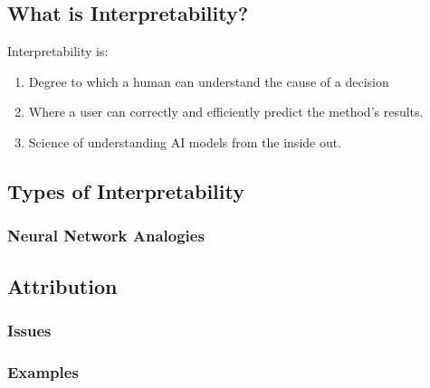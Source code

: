 \begin{motivation}

\end{motivation}

\subsection{What is Interpretability?}
\begin{definition}
    Interpretability is:
    \begin{enumerate}
        \item Degree to which a human can understand the cause of a decision
        \item Where a user can correctly and efficiently predict the method's results. 
        \item Science of understanding AI models from the inside out. 
    \end{enumerate}
\end{definition}

\subsection{Types of Interpretability}

\subsubsection{Neural Network Analogies}



\subsection{Attribution}

\subsubsection{Issues}



\subsubsection{Examples}
